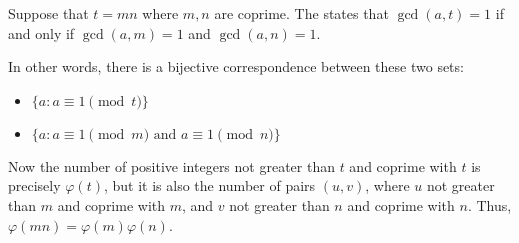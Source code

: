 \documentclass[12pt]{article}
\begin{document}

Suppose that $t=mn$ where $m,n$ are coprime.  The  states that $\gcd(a,t)=1$ if and only if $\gcd(a,m)=1$ and $\gcd(a,n)=1$. 

In other words, there is a bijective correspondence between these two sets:

\begin{itemize}
\item $\{a : a\equiv 1\pmod{t}\}$
\item $\{a : a\equiv1\pmod{m}\text{ and } a\equiv1\pmod{ n} \}$
\end{itemize}

Now the number of positive integers not greater than $t$ and coprime with $t$ is precisely $\varphi(t)$, but it is also the number of pairs $(u,v)$, where $u$ not greater than $m$ and coprime with $m$, and $v$ not greater than $n$ and coprime with $n$.  Thus, $\varphi(mn)=\varphi(m)\varphi(n)$.
\end{document}
